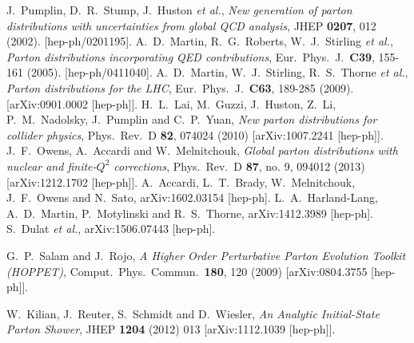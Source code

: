 \documentclass[12pt]{book}
\begin{document}
\begin{thebibliography}{19}
  J.~Pumplin, D.~R.~Stump, J.~Huston {\it et al.},
  {\em New generation of parton distributions with uncertainties from
    global QCD analysis},
  JHEP {\bf 0207}, 012 (2002).
  [hep-ph/0201195].
  A.~D.~Martin, R.~G.~Roberts, W.~J.~Stirling {\it et al.},
  {\em Parton distributions incorporating QED contributions},
  Eur.\ Phys.\ J.\  {\bf C39}, 155-161 (2005).
  [hep-ph/0411040].
  A.~D.~Martin, W.~J.~Stirling, R.~S.~Thorne {\it et al.},
  {\em Parton distributions for the LHC},
  Eur.\ Phys.\ J.\  {\bf C63}, 189-285 (2009).
  [arXiv:0901.0002 [hep-ph]].
  H.~L.~Lai, M.~Guzzi, J.~Huston, Z.~Li, P.~M.~Nadolsky, J.~Pumplin and C.~P.~Yuan,
  {\em New parton distributions for collider physics},
  Phys.\ Rev.\  D {\bf 82}, 074024 (2010)
  [arXiv:1007.2241 [hep-ph]].
  J.~F.~Owens, A.~Accardi and W.~Melnitchouk,
  {\em Global parton distributions with nuclear and finite-$Q^2$
    corrections},
  Phys.\ Rev.\ D {\bf 87}, no. 9, 094012 (2013)
  [arXiv:1212.1702 [hep-ph]].
  A.~Accardi, L.~T.~Brady, W.~Melnitchouk, J.~F.~Owens and N.~Sato,
  arXiv:1602.03154 [hep-ph].
  L.~A.~Harland-Lang, A.~D.~Martin, P.~Motylinski and R.~S.~Thorne,
  arXiv:1412.3989 [hep-ph].
  S.~Dulat {\it et al.},
  arXiv:1506.07443 [hep-ph].


  G.~P.~Salam and J.~Rojo,
  {\em A Higher Order Perturbative Parton Evolution Toolkit (HOPPET)},
  Comput.\ Phys.\ Commun.\  {\bf 180}, 120 (2009)
  [arXiv:0804.3755 [hep-ph]].

  W.~Kilian, J.~Reuter, S.~Schmidt and D.~Wiesler,
  {\em An Analytic Initial-State Parton Shower},
  JHEP {\bf 1204} (2012) 013
  [arXiv:1112.1039 [hep-ph]].


\end{thebibliography}
\end{document}
